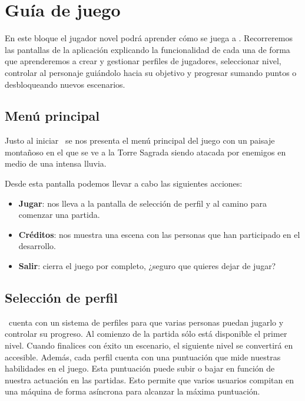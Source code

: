 \section*{Guía de juego}

En este bloque el jugador novel podrá aprender cómo se juega a \juego.
Recorreremos las pantallas de la aplicación explicando la funcionalidad de
cada una de forma que aprenderemos a crear y gestionar perfiles de jugadores,
seleccionar nivel, controlar al personaje guiándolo hacia su objetivo y
progresar sumando puntos o desbloqueando nuevos escenarios.\\

\subsection*{Menú principal}

Justo al iniciar \juego\ se nos presenta el menú principal del juego con
un paisaje montañoso en el que se ve a la Torre Sagrada siendo atacada
por enemigos en medio de una intensa lluvia.


Desde esta pantalla podemos llevar a cabo las siguientes acciones:

\begin{itemize}
    \itemsep0em
    \item \textbf{Jugar}: nos lleva a la pantalla de selección de perfil
    y al camino para comenzar una partida.
    \item \textbf{Créditos}: nos muestra una escena con las personas
    que han participado en el desarrollo.
    \item \textbf{Salir}: cierra el juego por completo, ¿seguro que quieres
    dejar de jugar?
\end{itemize}

\subsection*{Selección de perfil}

\juego\ cuenta con un sistema de perfiles para que varias personas puedan
jugarlo y controlar su progreso. Al comienzo de la partida sólo está disponible
el primer nivel. Cuando finalices con éxito un escenario, el
siguiente nivel se convertirá en accesible. Además, cada perfil cuenta con
una puntuación que mide nuestras habilidades en el juego. Esta puntuación
puede subir o bajar en función de nuestra actuación en las partidas. Esto
permite que varios usuarios compitan en una máquina de forma asíncrona
para alcanzar la máxima puntuación.\\

